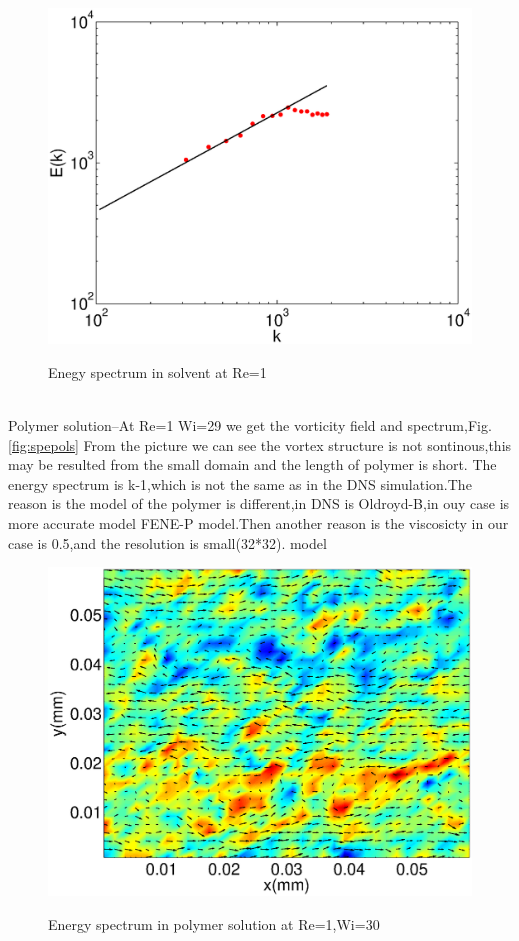 \documentclass[aps,prl,twocolumn,showpacs,superscriptaddress,groupedaddress]{revtex4}  %
\begin{document}
\begin{figure}
 \includegraphics[scale=0.5]{spesols}
\label{fig:spesols}
\caption{Enegy spectrum in solvent at Re=1}
\end{figure} \\
Polymer solution--At Re=1 Wi=29 we get the vorticity field and spectrum,Fig.\ref{fig:spepols}
From the picture we can see the vortex structure is not sontinous,this may be resulted from the small domain and the length of polymer is short.
The energy spectrum is k-1,which is not the same as in the DNS simulation.The reason is the model of the polymer is different,in DNS is Oldroyd-B,in ouy case is more accurate model
FENE-P model.Then another reason is the viscosicty in our case is 0.5,and the resolution is small(32*32).
model
\begin{figure}
 \includegraphics[scale=0.5]{vorpols}
\label{fig:vorpols}
\caption{Energy spectrum in polymer solution at Re=1,Wi=30}
\end{figure}\\
\end{document}
